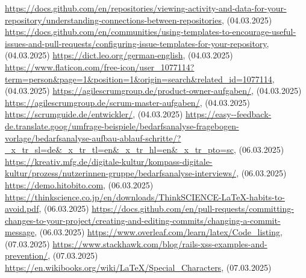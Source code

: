 \renewcommand\bibname{Quellenverzeichnis}
\begin{thebibliography}{9}
     \url{https://docs.github.com/en/repositories/viewing-activity-and-data-for-your-repository/understanding-connections-between-repositories}, (04.03.2025)
     \url{https://docs.github.com/en/communities/using-templates-to-encourage-useful-issues-and-pull-requests/configuring-issue-templates-for-your-repository}, (04.03.2025)
     \url{https://dict.leo.org/german-english}, (04.03.2025)
     \url{https://www.flaticon.com/free-icon/user_1077114?term=person&page=1&position=1&origin=search&related_id=1077114}, (04.03.2025)
     \url{https://agilescrumgroup.de/product-owner-aufgaben/}, (04.03.2025)
     \url{https://agilescrumgroup.de/scrum-master-aufgaben/}, (04.03.2025)
     \url{https://scrumguide.de/entwickler/}, (04.03.2025)
     \url{https://easy--feedback-de.translate.goog/umfrage-beispiele/bedarfsanalyse-fragebogen-vorlage/bedarfsanalyse-aufbau-ablauf-schritte/?_x_tr_sl=de&_x_tr_tl=en&_x_tr_hl=en&_x_tr_pto=sc}, (06.03.2025)
     \url{https://kreativ.mfg.de/digitale-kultur/kompass-digitale-kultur/prozess/nutzerinnen-gruppe/bedarfsanalyse-interviews/}, (06.03.2025)
     \url{https://demo.hitobito.com}, (06.03.2025)
     \url{https://thinkscience.co.jp/en/downloads/ThinkSCIENCE-LaTeX-habits-to-avoid.pdf}, (06.03.2025)
     \url{https://docs.github.com/en/pull-requests/committing-changes-to-your-project/creating-and-editing-commits/changing-a-commit-message}, (06.03.2025)
     \url{https://www.overleaf.com/learn/latex/Code_listing}, (07.03.2025)
     \url{https://www.stackhawk.com/blog/rails-xss-examples-and-prevention/}, (07.03.2025)
     \url{https://en.wikibooks.org/wiki/LaTeX/Special_Characters}, (07.03.2025)
    
\end{thebibliography}

